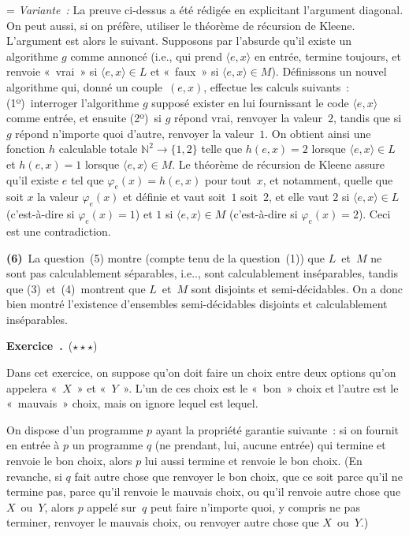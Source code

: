 \documentclass[12pt,a4paper]{article}
\theoremstyle{definition}
\newcommand\exercice{%
\refstepcounter{comcnt}\bigskip\noindent\textbf{Exercice~\thecomcnt.}}
\newif\ifcorrige
\newenvironment{corrige}%
{\ifcorrige\relax\else\setbox0=\vbox\bgroup\fi%
\smallbreak\footnotesize\noindent{\underbar{\textit{Corrigé.}}\quad}}
{{\hbox{}\nobreak\hfill\checkmark}%
\ifcorrige\relax\else\egroup\fi\par}
\begin{document}
\begin{corrige}
\emph{Variante :} La preuve ci-dessus a été rédigée en explicitant
l'argument diagonal.  On peut aussi, si on préfère, utiliser le
théorème de récursion de Kleene.  L'argument est alors le suivant.
Supposons par l'absurde qu'il existe un algorithme $g$ comme annoncé
(i.e., qui prend $\langle e,x\rangle$ en entrée, termine toujours, et
renvoie « vrai » si $\langle e,x\rangle\in L$ et « faux » si $\langle
e,x\rangle \in M$).  Définissons un nouvel algorithme qui, donné un
couple $(e,x)$, effectue les calculs suivants : (1º) interroger
l'algorithme $g$ supposé exister en lui fournissant le code $\langle
e,x\rangle$ comme entrée, et ensuite (2º) si $g$ répond vrai, renvoyer
la valeur $2$, tandis que si $g$ répond n'importe quoi d'autre,
renvoyer la valeur $1$.  On obtient ainsi une fonction $h$ calculable
totale $\mathbb{N}^2 \to \{1,2\}$ telle que $h(e,x) = 2$ lorsque
$\langle e,x\rangle\in L$ et $h(e,x) = 1$ lorsque $\langle
e,x\rangle\in M$.  Le théorème de récursion de Kleene assure qu'il
existe $e$ tel que $\varphi_e(x) = h(e,x)$ pour tout $x$, et
notamment, quelle que soit $x$ la valeur $\varphi_e(x)$ et définie et
vaut soit $1$ soit $2$, et elle vaut $2$ si $\langle e,x\rangle \in L$
(c'est-à-dire si $\varphi_e(x) = 1$) et $1$ si $\langle e,x\rangle \in
M$ (c'est-à-dire si $\varphi_e(x) = 2$).  Ceci est une contradiction.

\textbf{(6)} La question (5) montre (compte tenu de la question (1))
que $L$ et $M$ ne sont pas calculablement séparables, i.e.., sont
calculablement inséparables, tandis que (3) et (4) montrent que
$L$ et $M$ sont disjoints et semi-décidables.  On a donc bien montré
l'existence d'ensembles semi-décidables disjoints et calculablement
inséparables.
\end{corrige}

%

\exercice\label{exercise-good-bad-choice-lemma}\ (${\star}{\star}{\star}$)\par\nobreak

Dans cet exercice, on suppose qu'on doit faire un choix entre deux
options qu'on appelera « $X$ » et « $Y$ ».  L'un de ces choix est le
« bon » choix et l'autre est le « mauvais » choix, mais on ignore
lequel est lequel.

On dispose d'un programme $p$ ayant la propriété garantie suivante :
si on fournit en entrée à $p$ un programme $q$ (ne prendant, lui,
aucune entrée) qui termine et renvoie le bon choix, alors $p$ lui
aussi termine et renvoie le bon choix.  (En revanche, si $q$ fait
autre chose que renvoyer le bon choix, que ce soit parce qu'il ne
termine pas, parce qu'il renvoie le mauvais choix, ou qu'il renvoie
autre chose que $X$ ou $Y$, alors $p$ appelé sur $q$ peut faire
n'importe quoi, y compris ne pas terminer, renvoyer le mauvais choix,
ou renvoyer autre chose que $X$ ou $Y$.)
\end{document}
